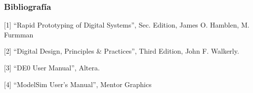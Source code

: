 \documentclass{beamer}
\begin{document}
\begin{frame}
\frametitle{Bibliografía}
\small{
[1] ``Rapid Prototyping of Digital Systems'', Sec. Edition, James O. Hamblen, M. Furmman

[2] ``Digital Design, Principles \& Practices'', Third Edition, John F. Walkerly.

[3] ``DE0 User Manual'', Altera.

[4] ``ModelSim User's Manual'', Mentor Graphics
}
\end{frame}

  
  
  
\end{document}
